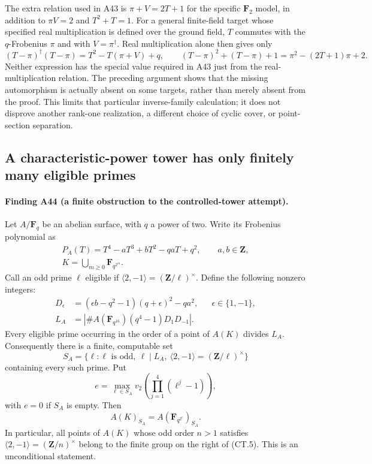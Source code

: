 \documentclass[11pt,a4paper]{article}
\begin{document}
The extra relation used in A43 is
$\pi+V=2T+1$ for the specific $\mathbf F_2$ model, in addition
to $\pi V=2$ and $T^2+T=1$.  For a general finite-field
target whose specified real multiplication is defined over the
ground field, $T$ commutes with the $q$-Frobenius $\pi$ and
with $V=\pi^\dagger$.  Real multiplication alone then gives only
\[
 (T-\pi)^\dagger(T-\pi)=T^2-T(\pi+V)+q,
 \qquad
 (T-\pi)^2+(T-\pi)+1
                =\pi^2-(2T+1)\pi+2.
\]
Neither expression has the special value required in A43 just
from the real-multiplication relation.  The preceding argument
shows that the missing automorphism is actually absent on some
targets, rather than merely absent from the proof.
This limits that particular inverse-family calculation; it
does not disprove another rank-one realization, a different
choice of cyclic cover, or point-section separation.


\subsection{A characteristic-power tower has only finitely many eligible primes}
\label{sec:pro-two-tower-obstruction}

\paragraph{Finding A44 (a finite obstruction to the controlled-tower attempt).}
Let $A/\mathbf F_q$ be an abelian surface, with $q$ a power of two.
Write its Frobenius polynomial as
\[
 \begin{gathered}
 P_A(T)=T^4-aT^3+bT^2-qaT+q^2,\qquad a,b\in\mathbf Z,\\
 K=\bigcup_{m\ge0}\mathbf F_{q^{2^m}}.
 \end{gathered}
 \tag{CT.1}
\]
Call an odd prime $\ell$ eligible if
$\langle2,-1\rangle=(\mathbf Z/\ell)^\times$.
Define the following nonzero integers:
\[
 \begin{aligned}
 D_\epsilon&=(\epsilon b-q^2-1)(q+\epsilon)^2-qa^2,
                         &&\epsilon\in\{1,-1\},\\
 L_A&=\left|\#A(\mathbf F_{q^{16}})
                    (q^4-1)D_1D_{-1}\right|.
 \end{aligned}
 \tag{CT.2}
\]
Every eligible prime occurring in the order of a point of $A(K)$
divides $L_A$. Consequently there is a finite, computable set
\[
 S_A=\{\ell:\ell\text{ is odd},\ \ell\mid L_A,\
                 \langle2,-1\rangle=(\mathbf Z/\ell)^\times\}
 \tag{CT.3}
\]
containing every such prime. Put
\[
 e=\max_{\ell\in S_A}v_2\!\left(
                   \prod_{j=1}^{4}(\ell^j-1)\right),
 \tag{CT.4}
\]
with $e=0$ if $S_A$ is empty. Then
\[
          A(K)_{S_A}=A(\mathbf F_{q^{2^e}})_{S_A}.
 \tag{CT.5}
\]
In particular, all points of $A(K)$ whose odd order $n>1$ satisfies
$\langle2,-1\rangle=(\mathbf Z/n)^\times$ belong to the finite
group on the right of (CT.5). This is an unconditional statement.
\end{document}
